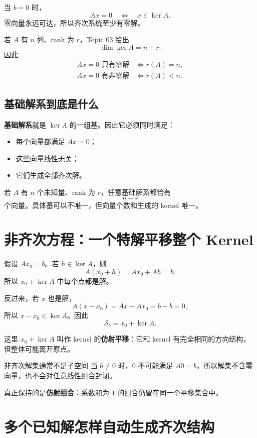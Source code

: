 \documentclass[11pt,a4paper]{ctexart}
\newcommand{\kw}[1]{\textbf{\color{deep}#1}}
\begin{document}
当 $b=0$ 时，
\[
Ax=0
\quad\Longleftrightarrow\quad
x\in\ker A.
\]
零向量永远可达，所以齐次系统至少有零解。

若 $A$ 有 $n$ 列、rank 为 $r$，Topic 03 给出
\[
\dim\ker A=n-r.
\]
因此
\[
\boxed{
\begin{aligned}
Ax=0\text{ 只有零解}&\iff r(A)=n,\\
Ax=0\text{ 有非零解}&\iff r(A)<n.
\end{aligned}}
\]

\subsection{基础解系到底是什么}

\kw{基础解系}就是 $\ker A$ 的一组基。因此它必须同时满足：
\begin{itemize}
  \item 每个向量都满足 $Ax=0$；
  \item 这些向量线性无关；
  \item 它们生成全部齐次解。
\end{itemize}

若 $A$ 有 $n$ 个未知量、rank 为 $r$，任意基础解系都恰有
\[
\boxed{n-r}
\]
个向量。具体基可以不唯一，但向量个数和生成的 kernel 唯一。

\section{非齐次方程：一个特解平移整个 Kernel}

假设 $Ax_0=b$。若 $h\in\ker A$，则
\[
A(x_0+h)=Ax_0+Ah=b.
\]
所以 $x_0+\ker A$ 中每个点都是解。

反过来，若 $x$ 也是解，
\[
A(x-x_0)=Ax-Ax_0=b-b=0,
\]
所以 $x-x_0\in\ker A$。因此
\[
\boxed{\mathcal S_b=x_0+\ker A.}
\]

这里 $x_0+\ker A$ 叫作 kernel 的\kw{仿射平移}：它和 kernel 有完全相同的方向结构，但整体可能离开原点。

\begin{warnbox}{非齐次解集通常不是子空间}
当 $b\neq0$ 时，$0$ 不可能满足 $A0=b$，所以解集不含零向量，也不会对任意线性组合封闭。

真正保持的是\kw{仿射组合}：系数和为 $1$ 的组合仍留在同一个平移集合中。
\end{warnbox}

\section{多个已知解怎样自动生成齐次结构}
\end{document}
